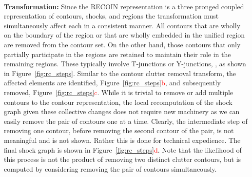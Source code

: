    
  


\noindent\\
{\bf Transformation:} Since the RECOIN representation is a three pronged coupled representation of contours, shocks, and regions the transformation must simultaneously affect each in a consistent manner. All contours that are wholly on the boundary of the region or that are wholly embedded in the unified region are removed from the contour set. On the other hand, those contours that only partially participate in the regions are retained to maintain their role in the remaining regions. These typically involve T-junctions or Y-junctions, \eg, as shown in Figure~\ref{fig:rc_steps}. Similar to the contour clutter removal transform, the affected elements are identified, Figure~\ref{fig:rc_steps}\textcolor{red}{b}, and subsequently removed, Figure~\ref{fig:rc_steps}\textcolor{red}{c}. While it is trivial to remove or add multiple contours to the contour representation, the local recomputation of the shock graph given these collective changes does not require new machinery as we can easily remove the pair of contours one at a time. Clearly, the intermediate step of removing one contour, before removing the second contour of the pair, is not meaningful and is not shown. Rather this is done for technical expedience. The final shock graph is shown in Figure~\ref{fig:rc_steps}\textcolor{red}{d}. Note that the likelihood of this process is not the product of removing two distinct clutter contours, but is computed by considering removing the pair of contours simultaneously. 

